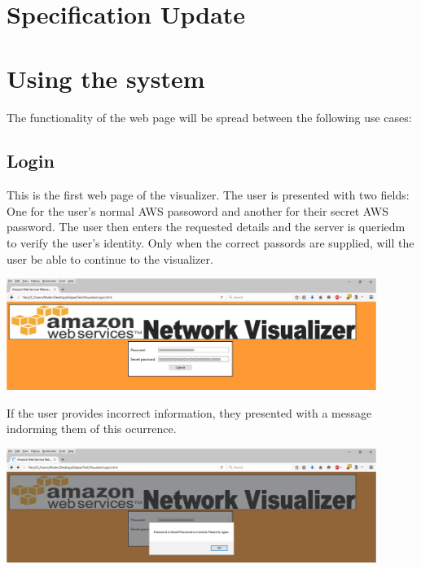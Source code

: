 \documentclass[hidelinks,a4paper,12pt]{article}
\begin{document}
	
\newpage
\section{Specification Update}
























\section{Using the system}
The functionality of the web page will be spread between the following use cases:

	\subsection{Login}
	
			This is the first web page of the visualizer. The user is presented with two fields: One for the user's normal AWS passoword and another for their secret AWS password. The user then enters the requested details and the server is queriedm to verify the user's identity. Only when the correct passords are supplied, will the user be able to continue to the visualizer.
		
    		\includegraphics[width=0.9\textwidth]{./images/Login1.png}
    		
    		If the user provides incorrect information, they presented with a message indorming them of this ocurrence.
    		
		  	\includegraphics[width=0.9\textwidth]{./images/Login2.png}
\end{document}
